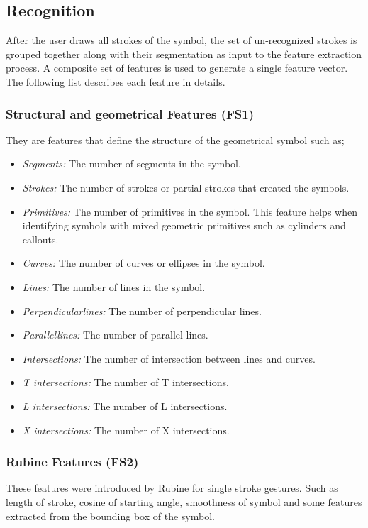 \documentclass[preprint,1p,times,review]{elsarticle}
\begin{document}
\subsection{Recognition}
\label{sec:Recognition}
After the user draws all strokes of the symbol, the set of un-recognized strokes
is grouped together along with their segmentation as input to the feature
extraction process. A composite set of features is used to generate a single
feature vector. The following list describes each feature in details.
\subsubsection{Structural and geometrical Features (FS1)}
  They are features that define the structure of the geometrical symbol such as;
 \begin{itemize}
	 \item \emph{Segments:} The number of segments in the symbol.
	 \item \emph{Strokes:} The number of strokes or partial strokes that
created the symbols.
		\item  \emph{Primitives:} The number of primitives in the
symbol. This feature helps when identifying  symbols with mixed geometric
primitives such as cylinders and callouts.
		\item \emph{Curves:} The number of curves or ellipses in the
symbol.
		\item \emph{Lines:} The number of lines in the symbol.
		\item \emph{Perpendicular}\emph{lines:} The number of
perpendicular lines.
		\item \emph{Parallel}\emph{lines:} The number of parallel lines.
		\item \emph{Intersections:} The number of intersection between
lines and curves.
		\item \emph{T intersections:} The number of T intersections.
		\item \emph{L intersections:} The number of L intersections.
		\item \emph{X intersections:} The number of X intersections.

\end{itemize}
\subsubsection{Rubine Features (FS2)}
  These features were introduced by Rubine \cite{gestureexample12} for single
stroke gestures. Such as length of stroke, cosine of starting angle, smoothness
of symbol and some features extracted from the bounding box of the symbol.
\end{document}
